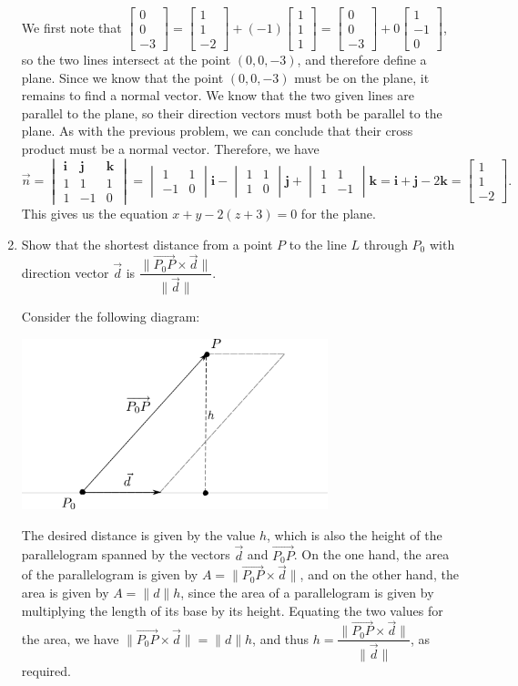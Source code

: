 \documentclass[12pt]{article}
\newcommand{\len}[1]{\lVert #1\rVert}
\renewcommand{\i}{\mathbf{i}}
\renewcommand{\j}{\mathbf{j}}
\renewcommand{\k}{\mathbf{k}}
\newcommand{\bbm}{\begin{bmatrix}}
\newcommand{\ebm}{\end{bmatrix}}
\newcommand{\bvm}{\begin{vmatrix}}
\newcommand{\evm}{\end{vmatrix}}
\begin{document}
\begin{enumerate}
We first note that $\bbm 0\\0\\-3\ebm = \bbm 1\\1\\-2\ebm + (-1)\bbm 1\\1\\1\ebm = \bbm 0\\0\\-3\ebm+0\bbm 1\\-1\\0\ebm$, so the two lines intersect at the point $(0,0,-3)$, and therefore define a plane. Since we know that the point $(0,0,-3)$ must be on the plane, it remains to find a normal vector. We know that the two given lines are parallel to the plane, so their direction vectors must both be parallel to the plane. As with the previous problem, we can conclude that their cross product must be a normal vector. Therefore, we have
\[
 \vec{n} = \bvm \i&\j&\k\\ 1&1&1\\ 1&-1&0\evm = \bvm 1&1\\-1&0\evm\i-\bvm 1&1\\1&0\evm\j +\bvm 1&1\\1&-1\evm\k = \i+\j-2\k = \bbm 1\\1\\-2\ebm.
\]
This gives us the equation $x+y-2(z+3)=0$ for the plane.


\item Show that the shortest distance from a point $P$ to the line $L$ through $P_0$ with direction vector $\vec{d}$ is $\dfrac{\len{\overrightarrow{P_0P}\times\vec{d}}}{\len{\vec{d}}}$.

Consider the following diagram:
\begin{center}
 \includegraphics[width=0.7\textwidth]{WS9-4}
\end{center}

The desired distance is given by the value $h$, which is also the height of the parallelogram spanned by the vectors $\vec{d}$ and $\overrightarrow{P_0P}$. On the one hand, the area of the parallelogram is given by $A=\len{\overrightarrow{P_0P}\times\vec{d}}$, and on the other hand, the area is given by $A = \len{d}h$, since the area of a parallelogram is given by multiplying the length of its base by its height. Equating the two values for the area, we have $\len{\overrightarrow{P_0P}\times\vec{d}}=\len{d}h$, and thus $h=\dfrac{\len{\overrightarrow{P_0P}\times\vec{d}}}{\len{\vec{d}}}$, as required.


\end{enumerate}
\end{document}

